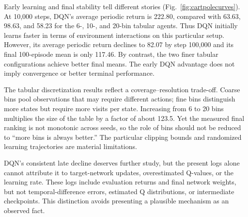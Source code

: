 \documentclass[a4paper,10pt,twocolumn]{article}
\begin{document}
Early learning and final stability tell different stories (Fig.~\ref{fig:cartpolecurves}). At 10,000 steps, DQN's average periodic return is 222.80, compared with 63.63, 98.63, and 58.23 for the 6-, 10-, and 20-bin tabular agents. Thus DQN initially learns faster in terms of environment interactions on this particular setup. However, its average periodic return declines to 82.07 by step 100,000 and its final 100-episode mean is only 117.46. By contrast, the two finer tabular configurations achieve better final means. The early DQN advantage does not imply convergence or better terminal performance.

The tabular discretization results reflect a coverage--resolution trade-off. Coarse bins pool observations that may require different actions; fine bins distinguish more states but require more visits per state. Increasing from 6 to 20 bins multiplies the size of the table by a factor of about 123.5. Yet the measured final ranking is not monotonic across seeds, so the role of bins should not be reduced to ``more bins is always better.'' The particular clipping bounds and randomized learning trajectories are material limitations.

DQN's consistent late decline deserves further study, but the present logs alone cannot attribute it to target-network updates, overestimated Q-values, or the learning rate. These logs include evaluation returns and final network weights, but not temporal-difference errors, estimated Q distributions, or intermediate checkpoints. This distinction avoids presenting a plausible mechanism as an observed fact.
\end{document}
